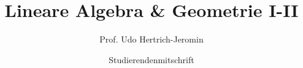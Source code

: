 \documentclass[a4paper, fontsize=11pt, DIV=12, parskip=half]{scrreprt}
\author{Studierendenmitschrift}
\title{Lineare Algebra \& Geometrie I-II}
\subtitle{Prof. Udo Hertrich-Jeromin}
\begin{document}
\maketitle
\tableofcontents



























\small
\printindex
\end{document}
